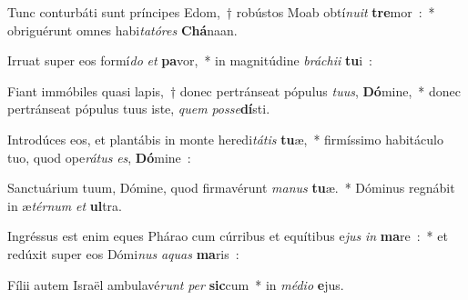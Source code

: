 \item Tunc conturbáti sunt príncipes Edom,~† robústos Moab obtí\emph{nu}\emph{it} \textbf{tre}mor~:~* obriguérunt omnes habi\emph{ta}\emph{tó}\emph{res} \textbf{Chá}naan.
\item Irruat super eos formí\emph{do} \emph{et} \textbf{pa}vor,~* in magnitúdine \emph{brá}\emph{chi}\emph{i} \textbf{tu}i~:
\item Fiant immóbiles quasi lapis,~† donec pertránseat pópulus \emph{tu}\emph{us}, \textbf{Dó}mine,~* donec pertránseat pópulus tuus iste, \emph{quem} \emph{pos}\emph{se}\textbf{dí}sti.
\item Introdúces eos, et plantábis in monte heredi\emph{tá}\emph{tis} \textbf{tu}æ,~* firmíssimo habitáculo tuo, quod ope\emph{rá}\emph{tus} \emph{es}, \textbf{Dó}mine~:
\item Sanctuárium tuum, Dómine, quod firmavérunt \emph{ma}\emph{nus} \textbf{tu}æ.~* Dóminus regnábit in æ\emph{tér}\emph{num} \emph{et} \textbf{ul}tra.
\item Ingréssus est enim eques Phárao cum cúrribus et equítibus e\emph{jus} \emph{in} \textbf{ma}re~:~* et redúxit super eos Dómi\emph{nus} \emph{a}\emph{quas} \textbf{ma}ris~:
\item Fílii autem Israël ambulavé\emph{runt} \emph{per} \textbf{sic}cum~* in \emph{mé}\emph{di}\emph{o} \textbf{e}jus.
